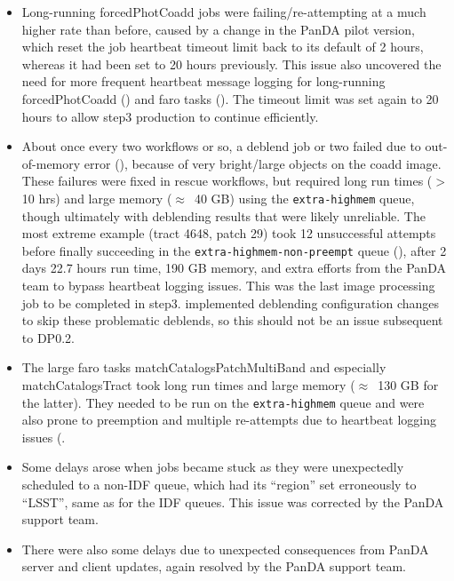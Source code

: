 \begin{itemize}
\begin{itemize}
  \item
  Long-running forcedPhotCoadd jobs were failing/re-attempting at a much higher rate than before, caused by a change in the PanDA pilot version, which reset the job heartbeat timeout limit back to its default of 2 hours, whereas it had been set to 20 hours previously.
  This issue also uncovered the need for more frequent heartbeat message logging for long-running forcedPhotCoadd () and faro tasks ().
  The timeout limit was set again to 20 hours to allow step3 production to continue efficiently.

  \item
  About once every two workflows or so, a deblend job or two failed due to out-of-memory error (), because of very bright/large objects on the coadd image.
  These failures were fixed in rescue workflows, but required long run times ($>$10 hrs) and large memory ($\approx$~40 GB) using the \texttt{extra-highmem} queue, though ultimately with deblending results that were likely unreliable.
  The most extreme example (tract 4648, patch 29) took 12 unsuccessful attempts before finally succeeding in the \texttt{extra-highmem-non-preempt} queue (), after 2 days 22.7 hours run time, 190 GB memory, and extra efforts from the PanDA team to bypass heartbeat logging issues.
  This was the last image processing job to be completed in step3.
   implemented deblending configuration changes to skip these problematic deblends, so this should not be an issue subsequent to DP0.2.

  \item
  The large faro tasks matchCatalogsPatchMultiBand and especially matchCatalogsTract took long run times and large memory ($\approx$~130 GB for the latter).
  They needed to be run on the \texttt{extra-highmem} queue and were also prone to preemption and multiple re-attempts due to heartbeat logging issues (.

 \item
  Some delays arose when jobs became stuck as they were unexpectedly scheduled to a non-IDF queue, which had its ``region'' set erroneously to ``LSST'', same as for the IDF queues.
  This issue was corrected by the PanDA support team.

  \item
  There were also some delays due to unexpected consequences from PanDA server and client updates, again resolved by the PanDA support team.

\end{itemize} %


\end{itemize}
